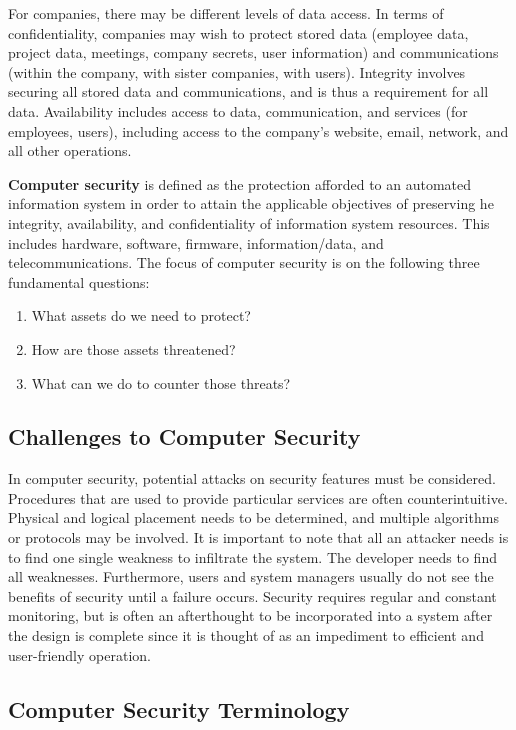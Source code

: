 \documentclass[11pt]{article}
\theoremstyle{plain} %
\theoremstyle{definition}
\theoremstyle{example}
\theoremstyle{remark}
\begin{document}
For companies, there may be different levels of data access. In terms of confidentiality, companies may wish to protect stored data (employee data, project data, meetings, company secrets, user information) and communications (within the company, with sister companies, with users). Integrity involves securing all stored data and communications, and is thus a requirement for all data. Availability includes access to data, communication, and services (for employees, users), including access to the company's website, email, network, and all other operations. 

\textbf{Computer security} is defined as the protection afforded to an automated information system in order to attain the applicable objectives of preserving he integrity, availability, and confidentiality of information system resources. This includes hardware, software, firmware, information/data, and telecommunications. The focus of computer security is on the following three fundamental questions:
\begin{enumerate}
\item What assets do we need to protect?
\item How are those assets threatened?
\item What can we do to counter those threats?
\end{enumerate}

\subsection{Challenges to Computer Security}

In computer security, potential attacks on security features must be considered. Procedures that are used to provide particular services are often counterintuitive. Physical and logical placement needs to be determined, and multiple algorithms or protocols may be involved. It is important to note that all an attacker needs is to find one single weakness to infiltrate the system. The developer needs to find all weaknesses. Furthermore, users and system managers usually do not see the benefits of security until a failure occurs. Security requires regular and constant monitoring, but is often an afterthought to be incorporated into a system after the design is complete since it is thought of as an impediment to efficient and user-friendly operation. 

\subsection{Computer Security Terminology}
\end{document}
